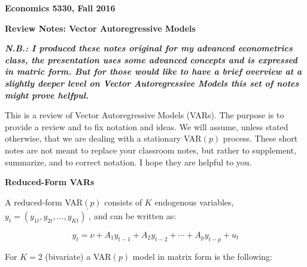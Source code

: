 \documentclass[11pt]{article}
\begin{document}
\pagestyle{empty}

\textbf{Economics 5330, Fall 2016}

\vspace{3.5mm}

\textbf{Review Notes: Vector Autoregressive Models}
\vspace{3.5mm}

\textbf{\textit{N.B.: I produced these notes original for my advanced econometrics class, the presentation uses some
advanced concepts and is expressed in matric form. But for those would like to have a brief overview at a slightly
deeper level on Vector Autoregressive Models this set of notes might prove helfpul.}}


This is a review of Vector Autoregressive Models (VARs).  The purpose is to
provide a review and to fix notation and ideas. We will assume, unless 
stated otherwise, that we are dealing with a stationary VAR$(p)$ process. These
short notes are not meant to replace your classroom notes, but rather to supplement,
summarize, and to correct notation.  I hope they are helpful to you.

\vspace{10mm}
\textbf{Reduced-Form VARs}

\vspace{3.5mm}
A reduced-form VAR$(p)$ consists of $K$ endogenous variables, 
$y_{t} = (y_{1t}, y_{2t}, \ldots, y_{Kt})^{\prime}$, and can be written as:

\begin{equation*}
y_{t} = \nu + A_{1} y_{t-1} + A_{2} y_{t-2} + \cdots + A_{p} y_{t-p} + u_{t}
\end{equation*} 

\vspace{3.5mm}
For $K=2$ (bivariate) a VAR$(p)$ model in matrix form is the following:
\end{document}
